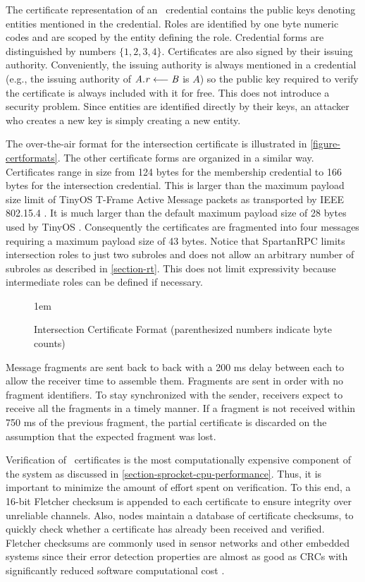 The certificate representation of an \RT\ credential contains the public keys denoting entities
mentioned in the credential. Roles are identified by one byte numeric codes and are scoped by
the entity defining the role. Credential forms are distinguished by numbers $\{ 1, 2, 3, 4 \}$.
Certificates are also signed by their issuing authority. Conveniently, the issuing authority is
always mentioned in a credential (e.g., the issuing authority of $\mathit{A.r} \stackrel{}{\longleftarrow} \mathit{B}$ is $A$) so
the public key required to verify the certificate is always included with it for free. This does
not introduce a security problem. Since entities are identified directly by their keys, an
attacker who creates a new key is simply creating a new entity.

The over-the-air format for the intersection certificate is illustrated in
\autoref{figure-certformats}. The other certificate forms are organized in a similar way.
Certificates range in size from 124 bytes for the membership credential to 166 bytes for the
intersection credential. This is larger than the maximum payload size limit of TinyOS T-Frame
Active Message packets as transported by IEEE 802.15.4 \cite{802.15.4,hui-tep125}. It is much
larger than the default maximum payload size of 28 bytes used by TinyOS \cite{levis-tep111}.
Consequently the certificates are fragmented into four messages requiring a maximum payload size
of 43 bytes. Notice that SpartanRPC limits intersection roles to just two subroles and does not
allow an arbitrary number of subroles as described in \autoref{section-rt}. This does not limit
expressivity because intermediate roles can be defined if necessary.

\begin{figure}[t]
  
  \centerline{\raise 1em\box\graph}
  \vspace{2mm}
  \caption{Intersection Certificate Format (parenthesized numbers indicate byte counts)}
  \label{figure-certformats}
\end{figure}

Message fragments are sent back to back with a 200 ms delay between each to allow the receiver
time to assemble them. Fragments are sent in order with no fragment identifiers. To stay
synchronized with the sender, receivers expect to receive all the fragments in a timely manner.
If a fragment is not received within 750 ms of the previous fragment, the partial certificate is
discarded on the assumption that the expected fragment was lost.

Verification of \RT\ certificates is the most computationally expensive component of the system
as discussed in \autoref{section-sprocket-cpu-performance}. Thus, it is important to minimize
the amount of effort spent on verification. To this end, a 16-bit Fletcher checksum is appended
to each certificate to ensure integrity over unreliable channels. Also, nodes maintain a
database of certificate checksums, to quickly check whether a certificate has already been
received and verified. Fletcher checksums are commonly used in sensor networks and other
embedded systems since their error detection properties are almost as good as CRCs with
significantly reduced software computational cost \cite{fletcher-1982}.

